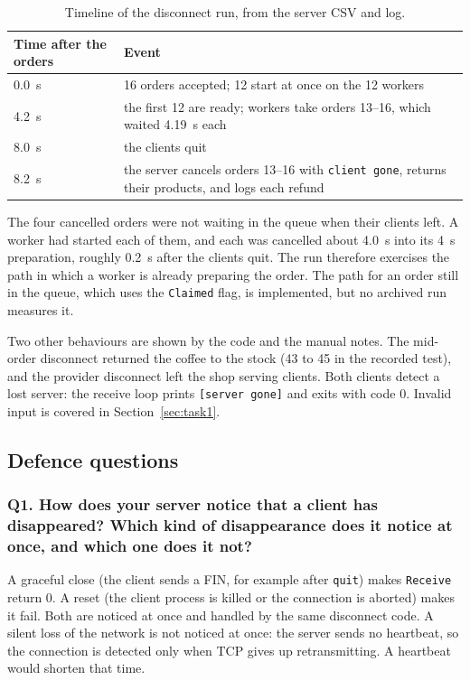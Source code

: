 \documentclass[12pt,a4paper]{article}
\begin{document}
\begin{table}[H]
\centering
\small
\begin{tabularx}{\textwidth}{@{}l X@{}}
\toprule
Time after the orders & Event \\
\midrule
0.0~s & 16 orders accepted; 12 start at once on the 12 workers \\
4.2~s & the first 12 are ready; workers take orders 13--16, which waited 4.19~s each \\
8.0~s & the clients quit \\
8.2~s & the server cancels orders 13--16 with \texttt{client gone}, returns their products, and logs each refund \\
\bottomrule
\end{tabularx}
\caption{Timeline of the disconnect run, from the server CSV and log.}
\label{tab:timeline}
\end{table}

The four cancelled orders were not waiting in the queue when their clients left.
A worker had started each of them, and each was cancelled about 4.0~s into its 4~s
preparation, roughly 0.2~s after the clients quit. The run therefore exercises the
path in which a worker is already preparing the order. The path for an order still
in the queue, which uses the \texttt{Claimed} flag, is implemented, but no archived
run measures it.

Two other behaviours are shown by the code and the manual notes. The mid-order
disconnect returned the coffee to the stock (43 to 45 in the recorded test), and the
provider disconnect left the shop serving clients. Both clients detect a lost server:
the receive loop prints \texttt{[server gone]} and exits with code 0. Invalid input
is covered in Section~\ref{sec:task1}.

\subsection{Defence questions}

    \subsubsection{Q1. How does your server notice that a client has disappeared? Which kind of disappearance does it notice at once, and which one does it not?}
    A graceful close (the client sends a FIN, for example after \texttt{quit}) makes
    \texttt{Receive} return 0. A reset (the client process is killed or the connection
    is aborted) makes it fail. Both are noticed at once and handled by the same disconnect
    code. A silent loss of the network is not noticed at once: the server sends no
    heartbeat, so the connection is detected only when TCP gives up retransmitting. A
    heartbeat would shorten that time.
\end{document}
